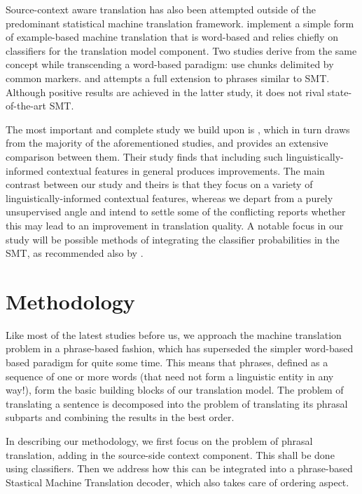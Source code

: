\documentclass[11pt]{article}
\theoremstyle{break}
\begin{document}
Source-context aware translation has also been attempted outside of the
predominant statistical machine translation framework. \cite{MBMT} implement a
simple form of example-based machine translation that is word-based and relies
chiefly on classifiers for the translation model component. Two studies derive
from the same concept while transcending a word-based paradigm:
\cite{MARKERBASED} use chunks delimited by common markers. and \cite{PBMBMT}
attempts a full extension to phrases similar to SMT. Although positive results
are achieved in the latter study, it does not rival state-of-the-art SMT.

The most important and complete study we build upon is \cite{Rejwanul+11},
which in turn draws from the majority of the aforementioned studies, and
provides an extensive comparison between them. Their study finds that including
such linguistically-informed contextual features in general produces
improvements.  The main contrast between our study and theirs is that they
focus on a variety of linguistically-informed contextual features, whereas we
depart from a purely unsupervised angle and intend to settle some of the
conflicting reports whether this may lead to an improvement in translation
quality. A notable focus in our study will be possible methods of integrating the
classifier probabilities in the SMT, as recommended also by \cite{Gimenez+07}.


\section{Methodology}
\label{ref:methodology}

Like most of the latest studies before us, we approach the machine translation
problem in a phrase-based fashion, which has superseded the simpler word-based
based paradigm for quite some time. This means that phrases, defined as a
sequence of one or more words (that need not form a linguistic entity in any
way!), form the basic building blocks of our translation model. The problem of
translating a sentence is decomposed into the problem of translating its phrasal
subparts and combining the results in the best order.

In describing our methodology, we first focus on the problem of phrasal
translation, adding in the source-side context component. This shall be done
using classifiers. Then we address how this can be integrated into a
phrase-based Stastical Machine Translation decoder, which also takes care of
ordering aspect. 
\end{document}
